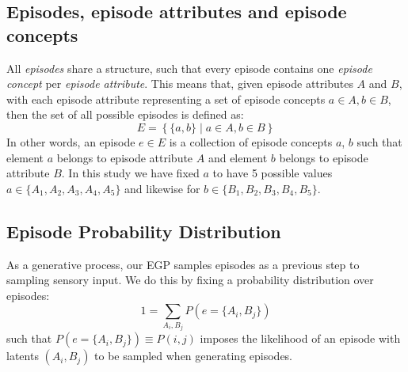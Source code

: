 \documentclass{article}
\begin{document}
\subsection*{Episodes, episode attributes and episode concepts}
All \textit{episodes} share a structure, such that every episode contains one \textit{episode concept} per \textit{episode attribute}. This means that, given episode attributes $A$ and $B$, with each episode attribute representing a set of episode concepts $a\in A, b\in B$, then the set of all possible episodes is defined as:
\begin{equation}
    E = \left\{ \{a, b\} \mid a \in A, b \in B \right\}
\end{equation}
In other words, an episode $e\in E$ is a collection of episode concepts $a$, $b$ such that element $a$ belongs to episode attribute  $A$ and element $b$ belongs to episode attribute $B$. In this study we have fixed $a$ to have 5 possible values $a\in \{A_1, A_2, A_3, A_4, A_5\}$ and likewise for $b\in \{B_1, B_2, B_3, B_4, B_5\}$.
\newline\newline
\subsection*{Episode Probability Distribution}
As a generative process, our EGP samples episodes as a previous step to sampling sensory input. We do this by fixing a probability distribution over episodes:
\begin{equation}
    1 = \sum_{A_i, B_j}P(e = \{A_i, B_j\}) 
\end{equation}
such that $P(e = \{A_i, B_j\}) \equiv P(i,j)$ imposes the likelihood of an episode with latents $(A_i, B_j)$ to be sampled when generating episodes.
\end{document}
